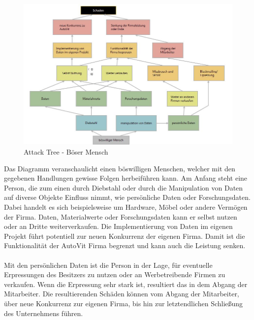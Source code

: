 \begin{figure}[h]
\includegraphics[scale=0.8, angle=90]{images/attacktree_boesermensch.jpg} 
\caption{Attack Tree - Böser Mensch}
\end{figure}

Das Diagramm veranschaulicht einen böswilligen Menschen, welcher mit den gegebenen Handlungen gewisse Folgen herbeiführen kann. Am Anfang steht eine Person, die zum einen durch Diebstahl oder durch die Manipulation von Daten auf diverse Objekte Einfluss nimmt, wie persönliche Daten oder Forschungsdaten. Dabei handelt es sich beispielsweise um Hardware, Möbel oder andere Vermögen der Firma. Daten, Materialwerte oder Forschungsdaten kann er selbst nutzen oder an Dritte weiterverkaufen. Die Implementierung von Daten im eigenen Projekt führt potentiell zur neuen Konkurrenz der eigenen Firma. Damit ist die Funktionalität der AutoVit Firma begrenzt und kann auch die Leistung senken.
\\
\\
Mit den persönlichen Daten ist die Person in der Lage, für eventuelle Erpressungen des Besitzers zu nutzen oder an Werbetreibende Firmen zu verkaufen. Wenn die Erpressung sehr stark ist, resultiert das in dem Abgang der Mitarbeiter. Die resultierenden Schäden können vom Abgang der Mitarbeiter, über neue Konkurrenz zur eigenen Firma, bis hin zur letztendlichen Schließung des Unternehmens führen.
\clearpage
